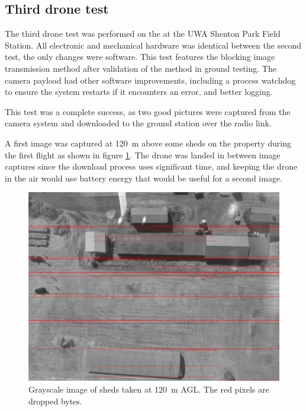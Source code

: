 \documentclass[]{report}
\begin{document}
\subsection{Third drone test}

The third drone test was performed on the  at the UWA Shenton Park Field Station. All electronic and mechanical hardware was identical between the second test, the only changes were software. This test features the blocking image transmission method after validation of the method in ground testing. The camera payload had other software improvements, including a process watchdog to ensure the system restarts if it encounters an error, and better logging.

This test was a complete success, as two good pictures were captured from the camera system and downloaded to the ground station over the radio link.

A first image was captured at \SI{120}{\metre} above some sheds on the property during the first flight as shown in figure \ref{fig:sheds-received}. The drone was landed in between image captures since the download process uses significant time, and keeping the drone in the air would use battery energy that would be useful for a second image.

\begin{figure}[H]
  \centering
  \includegraphics[width=\linewidth]{images/sheds_received.png}
  \caption{Grayscale image of sheds taken at \SI{120}{\metre} AGL. The red pixels are dropped bytes.}
  \label{fig:sheds-received}
\end{figure}
\end{document}
